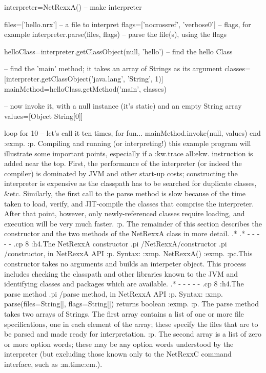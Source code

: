 interpreter=NetRexxA()             -- make interpreter

files=['hello.nrx']                -- a file to interpret
flags=['nocrossref', 'verbose0']   -- flags, for example
interpreter.parse(files, flags)    -- parse the file(s), using the flags

helloClass=interpreter.getClassObject(null, 'hello') -- find the hello Class

-- find the 'main' method; it takes an array of Strings as its argument
classes=[interpreter.getClassObject('java.lang', 'String', 1)]
mainMethod=helloClass.getMethod('main', classes)

-- now invoke it, with a null instance (it's static) and an empty String array
values=[Object String[0]]

loop for 10    -- let's call it ten times, for fun...
  mainMethod.invoke(null, values)
end
:exmp.
:p.
Compiling and running (or interpreting!) this example program will
illustrate some important points, especially if a :kw.trace all:ekw.
instruction is added near the top.  First, the performance of the
interpreter (or indeed the compiler) is dominated by JVM and other
start-up costs; constructing the interpreter is expensive as the
classpath has to be searched for duplicate classes, &etc.  Similarly,
the first call to the parse method is slow because of the time taken to
load, verify, and JIT-compile the classes that comprise the interpreter.
After that point, however, only newly-referenced classes require
loading, and execution will be very much faster.
:p.
The remainder of this section describes the constructor and the two
methods of the NetRexxA class in more detail.
.*
.* - - - - -
.cp 8
:h4.The NetRexxA constructor
.pi /NetRexxA/constructor
.pi /constructor, in NetRexxA API
:p.
Syntax:
:xmp.
NetRexxA()
:exmp.
:pc.This constructor takes no arguments and builds an interpeter object.
This process includes checking the classpath and other libraries known
to the JVM and identifying classes and packages which are available.
.* - - - - -
.cp 8
:h4.The parse method
.pi /parse method, in NetRexxA API
:p.
Syntax:
:xmp.
parse(files=String[], flags=String[]) returns boolean
:exmp.
:p.
The parse method takes two arrays of Strings.  The first array contains
a list of one or more file specifications, one in each element of the
array; these specify the files that are to be parsed and made ready for
interpretation.
:p.
The second array is a list of zero or more option words; these may be
any option words understood by the interpreter (but excluding those
known only to the NetRexxC command interface, such as :m.time:em.).
